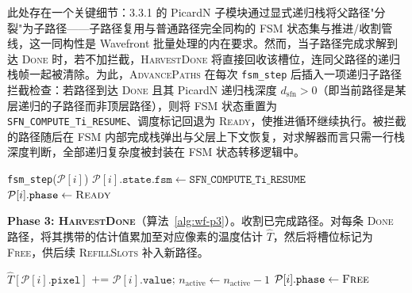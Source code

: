 此处存在一个关键细节：3.3.1 的 PicardN 子模块通过显式递归栈将父路径"分裂"为子路径——子路径复用与普通路径完全同构的 FSM 状态集与推进/收割管线，这一同构性是 Wavefront 批量处理的内在要求。然而，当子路径完成求解到达 \textsc{Done} 时，若不加拦截，\textsc{HarvestDone} 将直接回收该槽位，连同父路径的递归栈帧一起被清除。为此，\textsc{AdvancePaths} 在每次 \texttt{fsm\_step} 后插入一项递归子路径拦截检查：若路径到达 \textsc{Done} 且其 PicardN 递归栈深度 $d_\text{sfn} > 0$（即当前路径是某层递归的子路径而非顶层路径），则将 FSM 状态重置为 \texttt{SFN\_COMPUTE\_Ti\_RESUME}、调度标记回退为 \textsc{Ready}，使推进循环继续执行。被拦截的路径随后在 FSM 内部完成栈弹出与父层上下文恢复，对求解器而言只需一行栈深度判断，全部递归复杂度被封装在 FSM 状态转移逻辑中。

\begin{algorithm}[htbp]
\caption{\textsc{AdvancePaths} — 路径状态推进}
\label{alg:wf-p2}
\begin{algorithmic}[1]
    \REPEAT
      \STATE \texttt{fsm\_step}($\mathcal{P}[i]$) 
        \STATE $\mathcal{P}[i].\texttt{state}.\texttt{fsm} \leftarrow \texttt{SFN\_COMPUTE\_Ti\_RESUME}$ 
        \STATE $\mathcal{P}[i].\texttt{phase} \leftarrow \textsc{Ready}$ 
      \ENDIF
  \ENDIF
\ENDFOR
\end{algorithmic}
\end{algorithm}

\textbf{Phase 3: \textsc{HarvestDone}}（算法~\ref{alg:wf-p3}）。收割已完成路径。对每条 \textsc{Done} 路径，将其携带的估计值累加至对应像素的温度估计 $\hat{T}$，然后将槽位标记为 \textsc{Free}，供后续 \textsc{RefillSlots} 补入新路径。

\begin{algorithm}[htbp]
\caption{\textsc{HarvestDone} — 完成路径收割}
\label{alg:wf-p3}
\begin{algorithmic}[1]
    \STATE $\hat{T}[\mathcal{P}[i].\texttt{pixel}]$ += $\mathcal{P}[i].\texttt{value}$; \quad $n_\text{active} \leftarrow n_\text{active} - 1$
    \STATE $\mathcal{P}[i].\texttt{phase} \leftarrow \textsc{Free}$
  \ENDIF
\ENDFOR
\end{algorithmic}
\end{algorithm}

